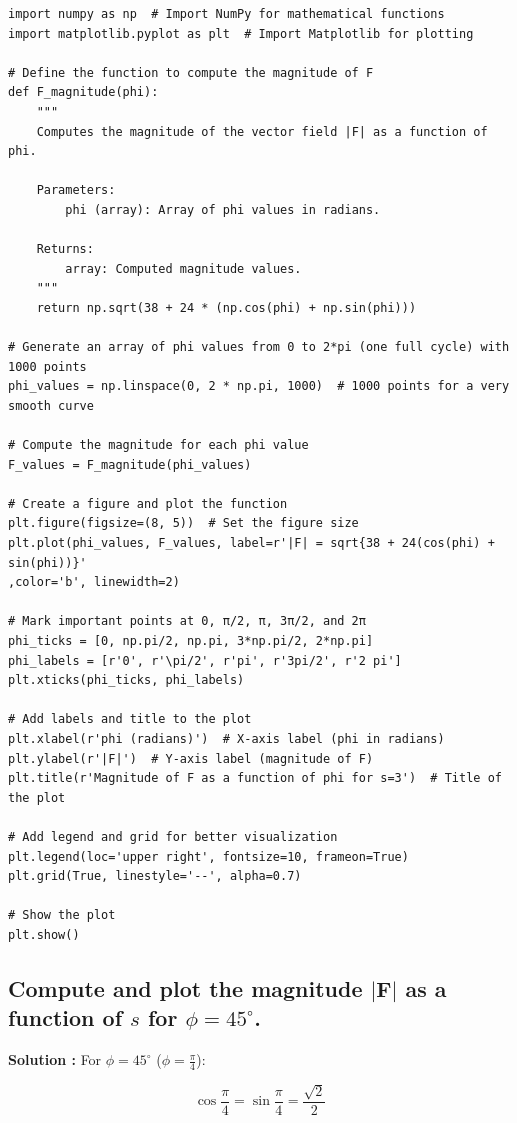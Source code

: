 \documentclass[a4paper,12pt]{article}
\begin{document}
\begin{verbatim}
import numpy as np  # Import NumPy for mathematical functions
import matplotlib.pyplot as plt  # Import Matplotlib for plotting

# Define the function to compute the magnitude of F
def F_magnitude(phi):
    """
    Computes the magnitude of the vector field |F| as a function of phi.
    
    Parameters:
        phi (array): Array of phi values in radians.
    
    Returns:
        array: Computed magnitude values.
    """
    return np.sqrt(38 + 24 * (np.cos(phi) + np.sin(phi)))

# Generate an array of phi values from 0 to 2*pi (one full cycle) with 1000 points
phi_values = np.linspace(0, 2 * np.pi, 1000)  # 1000 points for a very smooth curve

# Compute the magnitude for each phi value
F_values = F_magnitude(phi_values)

# Create a figure and plot the function
plt.figure(figsize=(8, 5))  # Set the figure size
plt.plot(phi_values, F_values, label=r'|F| = sqrt{38 + 24(cos(phi) + sin(phi))}'
,color='b', linewidth=2)

# Mark important points at 0, π/2, π, 3π/2, and 2π
phi_ticks = [0, np.pi/2, np.pi, 3*np.pi/2, 2*np.pi]
phi_labels = [r'0', r'\pi/2', r'pi', r'3pi/2', r'2 pi']
plt.xticks(phi_ticks, phi_labels)

# Add labels and title to the plot
plt.xlabel(r'phi (radians)')  # X-axis label (phi in radians)
plt.ylabel(r'|F|')  # Y-axis label (magnitude of F)
plt.title(r'Magnitude of F as a function of phi for s=3')  # Title of the plot

# Add legend and grid for better visualization
plt.legend(loc='upper right', fontsize=10, frameon=True)  
plt.grid(True, linestyle='--', alpha=0.7) 

# Show the plot
plt.show()
\end{verbatim}

\subsection{Compute and plot the magnitude \( |\mathbf{F}| \) as a function of \( s \) for \( \phi = 45 ^\circ \).}
\textbf{Solution :} For \( \phi = 45^\circ \) (\( \phi = \frac{\pi}{4} \)):

\[
\cos\frac{\pi}{4} = \sin\frac{\pi}{4} = \frac{\sqrt{2}}{2}
\]
\end{document}
